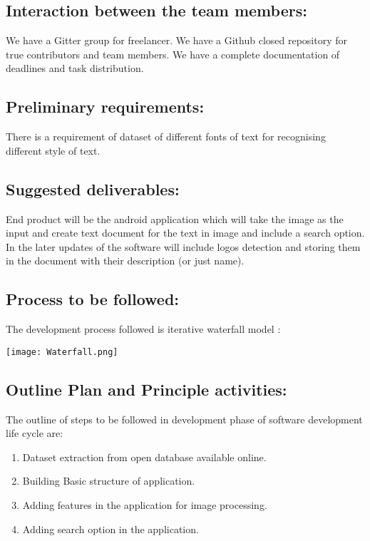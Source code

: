 \documentclass[18 pt]{article}
\begin{document}
\begin{large}
\subsection*{Interaction between the team members:}
We have a Gitter group for freelancer.
We have a Github closed repository for true contributors and team members.
We have a complete documentation of deadlines and task distribution.

\subsection*{Preliminary requirements:}
There is a requirement of dataset of different fonts of text for recognising different style of text.

\subsection*{Suggested deliverables:}
End product will be the android application which will take the image as the input and create text document for the text in image and include a search option. In the later updates of the software will include logos detection and storing them in the document with their description (or just name).

\subsection*{Process to be followed:}
The development process followed is iterative waterfall model :
\begin{center}
\texttt{[image: Waterfall.png]}
\end{center}

\subsection*{Outline Plan and Principle activities:}
The outline of steps to be followed in development phase of software development life cycle are:
\begin{enumerate}
\item	Dataset extraction from open database available online.

\item	Building Basic structure of application.

\item	Adding features in the application for image processing.

\item	Adding search option in the application.




\end{enumerate}
\end{large}
\end{document}
